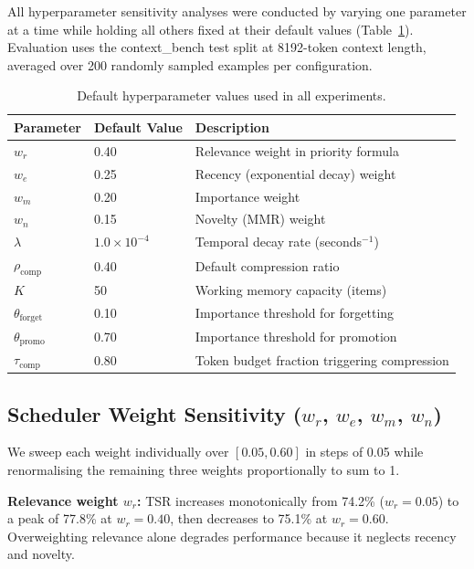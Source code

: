 All hyperparameter sensitivity analyses were conducted by varying one parameter
at a time while holding all others fixed at their default values
(Table~\ref{tab:app_default_params}).  Evaluation uses the context\_bench test
split at 8192-token context length, averaged over 200 randomly sampled examples
per configuration.

\begin{table}[h!]
\centering
\caption{Default hyperparameter values used in all experiments.}
\label{tab:app_default_params}
\begin{tabular}{@{}lll@{}}
\toprule
\textbf{Parameter} & \textbf{Default Value} & \textbf{Description} \\
\midrule
$w_r$ & 0.40 & Relevance weight in priority formula \\
$w_e$ & 0.25 & Recency (exponential decay) weight \\
$w_m$ & 0.20 & Importance weight \\
$w_n$ & 0.15 & Novelty (MMR) weight \\
$\lambda$ & $1.0 \times 10^{-4}$ & Temporal decay rate (seconds$^{-1}$) \\
$\rho_{\text{comp}}$ & 0.40 & Default compression ratio \\
$K$ & 50 & Working memory capacity (items) \\
$\theta_{\text{forget}}$ & 0.10 & Importance threshold for forgetting \\
$\theta_{\text{promo}}$ & 0.70 & Importance threshold for promotion \\
$\tau_{\text{comp}}$ & 0.80 & Token budget fraction triggering compression \\
\bottomrule
\end{tabular}
\end{table}

\subsection{Scheduler Weight Sensitivity ($w_r$, $w_e$, $w_m$, $w_n$)}

We sweep each weight individually over $[0.05, 0.60]$ in steps of 0.05 while
renormalising the remaining three weights proportionally to sum to 1.

\textbf{Relevance weight $w_r$:}  TSR increases monotonically from 74.2\%
($w_r = 0.05$) to a peak of 77.8\% at $w_r = 0.40$, then decreases to
75.1\% at $w_r = 0.60$.  Overweighting relevance alone degrades performance
because it neglects recency and novelty.

